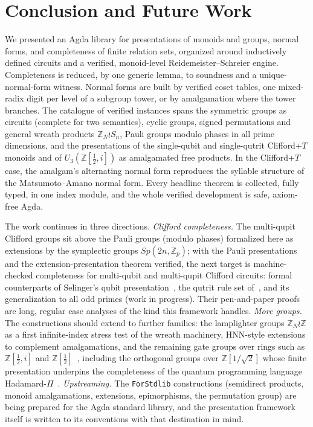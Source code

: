 \section{Conclusion and Future Work}\label{sec:conclusion}

We presented an Agda library for presentations of monoids and groups,
normal forms, and completeness of finite relation sets, organized around
inductively defined circuits and a verified, monoid-level
Reidemeister--Schreier engine.  Completeness is reduced, by one generic
lemma, to soundness and a unique-normal-form witness.  Normal forms are built
by verified coset tables, one mixed-radix digit per level of a subgroup
tower, or by amalgamation where the tower branches.  The catalogue of
verified instances spans the symmetric groups as circuits (complete for
two semantics), cyclic groups, signed permutations and general wreath
products $\mathbb{Z}_N \wr S_n$, Pauli groups modulo phases in all prime
dimensions, and the presentations of the single-qubit and single-qutrit
Clifford+$T$ monoids and of $U_3(\mathbb{Z}[\tfrac12,i])$ as amalgamated
free products.  In the Clifford+$T$ case, the amalgam's alternating normal
form reproduces the syllable structure of the Matsumoto--Amano normal
form.  Every headline theorem is collected, fully
typed, in one index module, and the whole verified development is safe,
axiom-free Agda.

The work continues in three directions.  \emph{Clifford
completeness.}  The multi-qupit Clifford groups sit above the Pauli
groups (modulo phases) formalized here as extensions by the symplectic
groups $Sp(2n,\mathbb{Z}_p)$; with the Pauli presentations and the
extension-presentation theorem verified, the next target is
machine-checked completeness for multi-qubit and multi-qupit
Clifford circuits: formal counterparts of Selinger's qubit
presentation~\cite{selinger2015clifford}, the qutrit rule set
of~\cite{li2025qutrit}, and its generalization to all odd primes (work in
progress).  Their pen-and-paper proofs are long, regular case analyses of
the kind this framework handles.  \emph{More groups.}  The
constructions should extend to further families: the lamplighter groups
$\mathbb{Z}_N \wr \mathbb{Z}$ as a first infinite-index stress test of
the wreath machinery, HNN-style extensions to complement amalgamations,
and the remaining gate groups over rings such as $\mathbb{Z}[\tfrac12,i]$
and $\mathbb{Z}[\tfrac12]$~\cite{bian2021un,li2021on}, including
the orthogonal groups over $\mathbb{Z}[1/\sqrt2]$ whose finite
presentation underpins the completeness of the quantum programming
language Hadamard-$\Pi$~\cite{fang2026hadamard}.
\emph{Upstreaming.}  The \texttt{ForStdlib} constructions (semidirect
products, monoid amalgamations, extensions, epimorphisms, the permutation
group) are being prepared for the Agda standard library, and the
presentation framework itself is written to its conventions with that
destination in mind.

